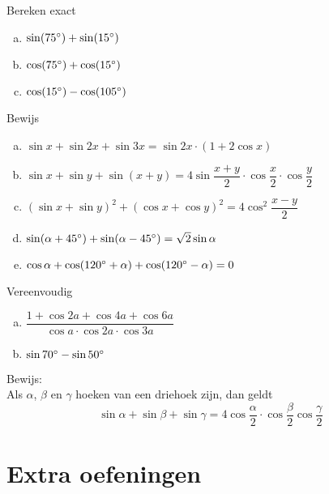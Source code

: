 \documentclass[twoside,a4paper,12pt]{article}
\begin{document}
\begin{oefening}
Bereken exact
\begin{enumerate}[(a)]
\itemsep.5em
  \item $\sin(75^\circ)+\sin(15^\circ)$
  \item $\cos(75^\circ)+\cos(15^\circ)$
  \item $\cos(15^\circ)-\cos(105^\circ)$
\end{enumerate}
\end{oefening}

\begin{oefening}
Bewijs
\begin{enumerate}[(a)]
\itemsep.8em
  \item $\sin x + \sin 2x + \sin 3x = \sin 2x \cdot (1 + 2\cos x)$
  \item $\sin x + \sin y + \sin(x+y) = 4\sin\dfrac{x+y}{2}\cdot\cos\dfrac{x}{2}\cdot\cos\dfrac{y}{2}$
  \item $\left(\sin x + \sin y\right)^2 + \left(\cos x + \cos y\right)^2 = 4\cos^2\dfrac{x-y}{2}$
  \item $\sin(\alpha + 45^\circ) + \sin(\alpha - 45^\circ) = \sqrt{2}\sin\alpha$
  \item $\cos \alpha + \cos(120^\circ + \alpha) + \cos(120^\circ - \alpha) = 0$
\end{enumerate}
\end{oefening}

\begin{oefening}
Vereenvoudig\\
\begin{enumerate}[(a)]
\itemsep.8em
  \item $\dfrac{1+\cos 2a + \cos 4a + \cos 6a}{\cos a \cdot \cos 2a \cdot \cos 3a}$
  \item $\sin 70^\circ - \sin 50^\circ$
\end{enumerate}
\end{oefening}

 \begin{oefening}Bewijs:\\
 Als $\alpha$, $\beta$ en $\gamma$ hoeken van een driehoek zijn, dan geldt
 $$\sin\alpha + \sin\beta + \sin\gamma = 4 \cos\dfrac{\alpha}{2}\cdot\cos\dfrac{\beta}{2}\cos\dfrac{\gamma}{2}$$
 \end{oefening}

\cleardoublepage
\section{Extra oefeningen}
\end{document}
